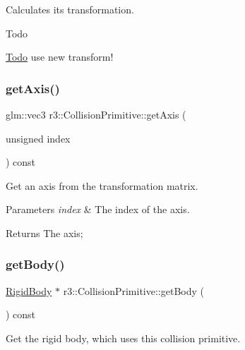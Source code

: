 Calculates its transformation. 

\begin{DoxyRefDesc}{Todo}
\item[\mbox{\hyperlink{todo__todo000018}{Todo}}]use new transform! \end{DoxyRefDesc}
\mbox{\label{classr3_1_1_collision_primitive_a78c959f5ca0a09a0fc2038ac7f30e45a}} 
\subsubsection{\texorpdfstring{get\+Axis()}{getAxis()}}
{\footnotesize\ttfamily glm\+::vec3 r3\+::\+Collision\+Primitive\+::get\+Axis (\begin{DoxyParamCaption}\item[{unsigned}]{index }\end{DoxyParamCaption}) const}



Get an axis from the transformation matrix. 


\begin{DoxyParams}{Parameters}
{\em index} & The index of the axis. \\
\hline
\end{DoxyParams}
\begin{DoxyReturn}{Returns}
The axis; 
\end{DoxyReturn}
\mbox{\label{classr3_1_1_collision_primitive_af8dbda90cce34a6262309cbdb75feea7}} 
\subsubsection{\texorpdfstring{get\+Body()}{getBody()}}
{\footnotesize\ttfamily \mbox{\hyperlink{classr3_1_1_rigid_body}{Rigid\+Body}} $\ast$ r3\+::\+Collision\+Primitive\+::get\+Body (\begin{DoxyParamCaption}{ }\end{DoxyParamCaption}) const}



Get the rigid body, which uses this collision primitive. 

